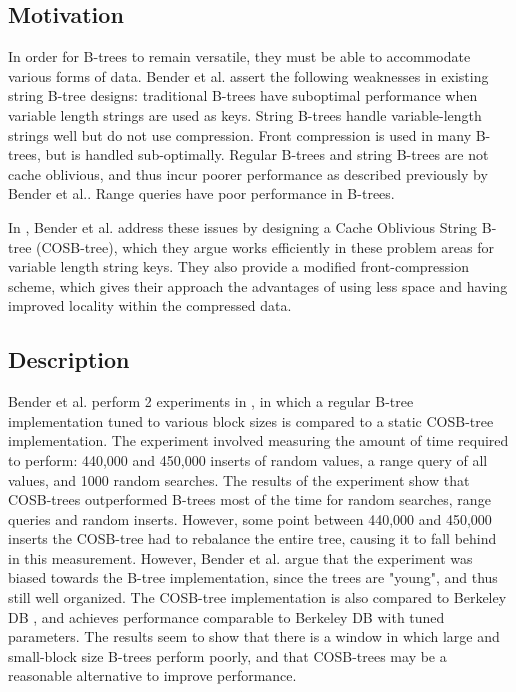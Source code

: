 \documentclass{style}
\begin{document}
\subsection{Motivation}

In order for B-trees to remain versatile, they must be able to accommodate
various forms of data. Bender et al. assert the following weaknesses in existing string B-tree designs: traditional B-trees have
suboptimal performance when variable length strings are used as keys\cite{BenderDemainColton}. String B-trees\cite{Ferragina98} handle variable-length strings well but do not use compression. Front compression\cite{BayerUn77,ClarkSaSt69,Comer79,Wagner73} is used in many B-trees, but is handled sub-optimally\cite{BenderFaKu06}. Regular B-trees and string B-trees are
not cache oblivious, and thus incur poorer performance as described
previously by Bender et al.\cite{BenderDemainColton}. Range queries have poor performance in B-trees\cite{BenderFaKu06}. 

In
\cite{BenderFaKu06}, Bender et al. address these issues by designing a Cache
Oblivious String B-tree (COSB-tree), which they argue works efficiently in
these problem areas for variable length string keys. They also provide a
modified front-compression scheme, which gives their approach the advantages
of using less space and having improved locality within the compressed data.

\subsection{Description}
Bender et al. perform 2 experiments in \cite{BenderFaKu06}, in which a regular B-tree implementation tuned to various block sizes is compared to a static COSB-tree implementation. The experiment involved measuring the amount of time required to perform: 440,000 and 450,000 inserts of random values, a range query of all values, and 1000 random searches. The results of the experiment show that COSB-trees
outperformed B-trees most of the time for random searches, range queries and
random inserts. However, some point between 440,000 and 450,000 inserts the
COSB-tree had to rebalance the entire tree, causing it to fall behind in this
measurement. However, Bender et al. argue that the experiment was biased
towards the B-tree implementation, since the trees are "young", and thus still
well organized. The COSB-tree implementation is also compared to Berkeley DB
\cite{BerkeleyDB}, and achieves performance comparable to Berkeley DB with
tuned parameters. The results seem to show that there is a window in which
large and small-block size B-trees perform poorly, and that COSB-trees may be
a reasonable alternative to improve performance. 
\end{document}
